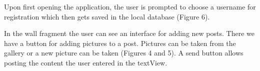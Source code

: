 \documentclass{report}
\begin{document}
\begin{figure}[H]
	\centering
	\hfill
	\hfill
	
\end{figure}

Upon first opening the application, the user is prompted to choose a username for registration which then gets saved in the local database (Figure 6).

In the wall fragment the user can see an interface for adding new posts. There we have a button for adding pictures to a post. Pictures can be taken from the gallery or a new picture can be taken (Figures 4 and 5). A send button allows posting the content the user entered in the textView.
\end{document}
